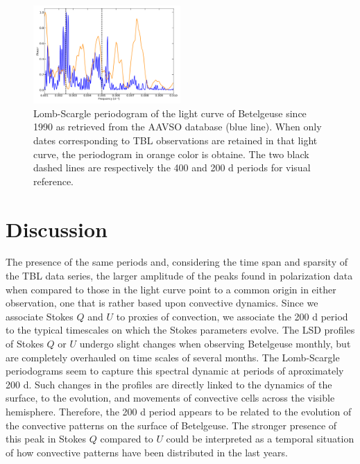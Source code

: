 \documentclass{aa}
\begin{document}
\begin{figure}[!h]
    \centering
    \includegraphics[width=0.5\textwidth]{Lomb-Scargle AAVSO.pdf}
    \caption{Lomb-Scargle periodogram of the light curve of Betelgeuse since 1990 as retrieved from the AAVSO database (blue line). When only dates corresponding to TBL observations are retained in 
    that light curve, the periodogram in orange color is obtaine. The two black dashed lines are respectively the 400 and 200 d periods for visual reference.}
    \label{Lomb Scargle AAVSO}
\end{figure}

\section{Discussion}
\label{section 4}
The presence of the same 
periods and, considering the time span and sparsity of the TBL data series, the larger amplitude of the peaks found in
polarization data when compared to those in the light curve point to a common origin in either observation, one that is rather based upon convective dynamics. Since we associate Stokes $Q$ and $U$ to proxies of convection, we associate the 200 d period to the typical timescales on which the Stokes parameters evolve. 
The LSD profiles of Stokes $Q$ or $U$ undergo slight changes when observing Betelgeuse monthly, but are completely overhauled 
on time scales of several months. The Lomb-Scargle periodograms seem to capture this spectral dynamic at periods of aproximately 200 d. Such changes in the profiles are directly linked to the dynamics of the surface,  to  the evolution, and movements 
of convective cells across the visible hemisphere. Therefore, the 200 d period appears to be related to the evolution of the convective patterns 
on the surface of Betelgeuse.  The stronger presence of this peak in Stokes $Q$ compared to $U$ could be interpreted as a temporal situation of how convective patterns have been distributed in the
last years.\
\end{document}

